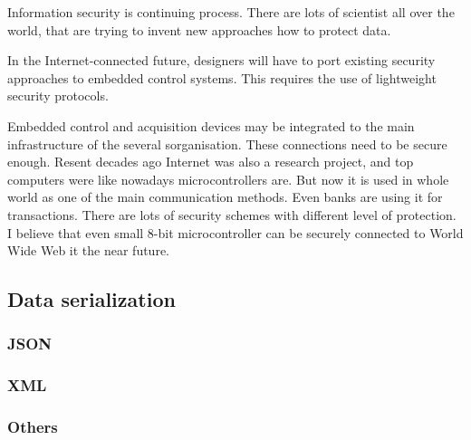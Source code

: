 Information security is continuing process. There are lots of scientist all
over the world, that are trying to invent new approaches how to protect data.

In the Internet-connected future, designers will have to port existing
security approaches to embedded control systems. This requires the use of 
lightweight security protocols.

Embedded control and acquisition devices may be integrated to the main
infrastructure of the several sorganisation. These connections need to be secure
enough.
Resent decades ago Internet was also a research project, and top computers were
like nowadays microcontrollers are. But now it is used in whole world as one of
the main communication methods. Even banks are using it for transactions. There are
lots of security schemes with different level of protection. I believe that
even small 8-bit microcontroller can be securely connected to World Wide Web it
the near future.



\subsection{Data serialization}
\subsubsection{JSON}
\subsubsection{XML}
\subsubsection{Others}